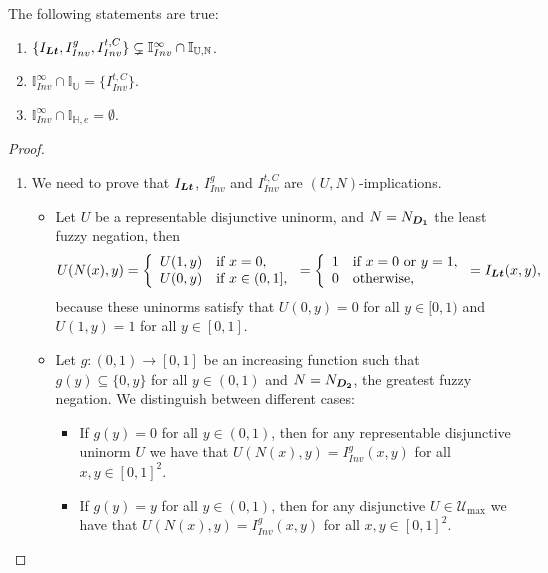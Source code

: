 \begin{proposition}\label{prop:strict:IntUN} The following statements are true:
	\begin{enumerate}[label=(\roman*)]
		\item $\{I_{\bm{Lt}},I_{Inv}^{g},I_{Inv}^{t,C}\} \subsetneq \mathbb{I}^{\infty}_{Inv} \cap \mathbb{I}_{\mathbb{U},\mathbb{N}}$.
		\item $\mathbb{I}^{\infty}_{Inv} \cap \mathbb{I}_{\mathbb{U}}=\{I_{Inv}^{t,C}\}$.
		\item $\mathbb{I}^{\infty}_{Inv} \cap \mathbb{I}_{\mathbb{H},e} = \emptyset$.
	\end{enumerate}
\end{proposition}
\begin{proof}  \hspace{0.5cm}  
	\begin{enumerate}[label=(\roman*)]
		\item We need to prove that $I_{\bm{Lt}}$, $I_{Inv}^{g}$ and $I_{Inv}^{t,C}$ are $(U,N)$-implications.
		\begin{itemize}
			\item Let $U$ be a representable disjunctive uninorm, and $N=N_{\bm{D_1}}$ the least fuzzy negation, then
			$$
			U(N(x),y)=\left\{ \begin{array}{ll}
				U(1,y) &  \text{if }  x=0, \\
				U(0,y) &  \text{if } x \in (0,1],
			\end{array}
			\right.
			=
			\left\{ \begin{array}{ll}
				1 &  \text{if }  x=0 \text{ or } y=1, \\
				0 &  \text{otherwise,}
			\end{array}
			\right.
			=
			I_{\bm{Lt}}(x,y),
			$$
			because these uninorms satisfy that $U(0,y)=0$ for all $y\in[0,1)$ and $U(1,y)=1$ for all $y\in[0,1]$.
			\item Let $g:(0,1) \to [0,1]$ be an increasing function such that $g(y) \subseteq \{0,y\}$ for all $y \in (0,1)$ and $N=N_{\bm{D_2}}$, the greatest fuzzy negation. We distinguish between different cases:
			\begin{itemize}
				\item If $g(y)=0$ for all $y \in (0,1)$, then for any representable disjunctive uninorm $U$ we have that $U(N(x),y)=I_{Inv}^{g}(x,y)$ for all $x,y \in [0,1]^2$.
				\item If $g(y)=y$ for all $y \in (0,1)$, then for any disjunctive $U \in \mathcal{U}_{\max}$ we have that $U(N(x),y)=I_{Inv}^{g}(x,y)$ for all $x,y \in [0,1]^2$.

\end{itemize}
\end{itemize}
\end{enumerate}
\end{proof}
